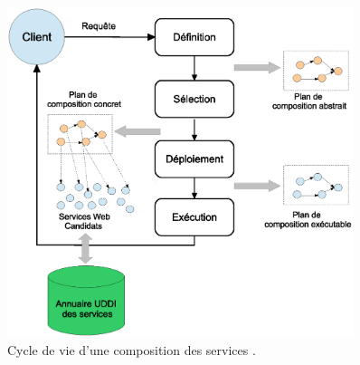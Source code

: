\begin{figure}[h]
    \centering
    \includegraphics[width=0.9\textwidth]{figs/composition-life-cycle.eps}
    \caption{Cycle de vie d'une composition des services
      \cite{sheng2014web}.}
    \label{fig:composition-life-cycle}
\end{figure}

